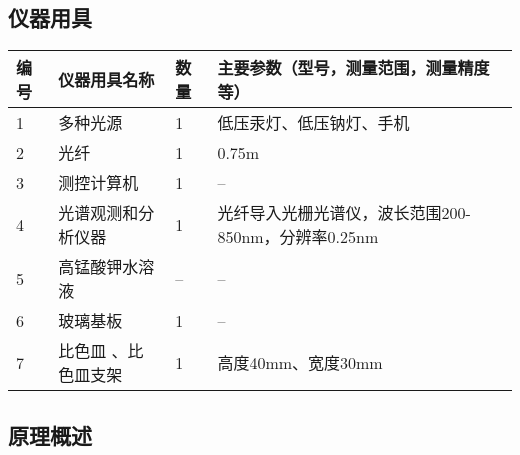 \documentclass[dvipsnames, svgnames,a4paper,11pt]{article}
\begin{document}
	\subsection{仪器用具}
	\begin{table}[htbp]
		\centering
		\renewcommand\arraystretch{1.6}
		\begin{tabular}{|p{}|p{}|p{}|p{}|}
			\hline
			编号& 仪器用具名称 & 数量 &  主要参数（型号，测量范围，测量精度等） \\
			\hline
			1& 多种光源 & 1 & 低压汞灯、低压钠灯、手机 \\
			\hline
			2& 光纤 & 1 & 0.75m \\
			\hline
			3& 测控计算机 & 1 & -- \\
			\hline
			4& 光谱观测和分析仪器 & 1 & 光纤导入光栅光谱仪，波长范围200-850nm，分辨率0.25nm \\
			\hline
			5& 高锰酸钾水溶液 & -- & -- \\
			\hline
			6& 玻璃基板 & 1 & -- \\
			\hline
			7& 比色皿 、比色皿支架& 1 & 高度40mm、宽度30mm \\
			\hline
		\end{tabular}
	\end{table}
	
	\subsection{原理概述}
	
\end{document}
